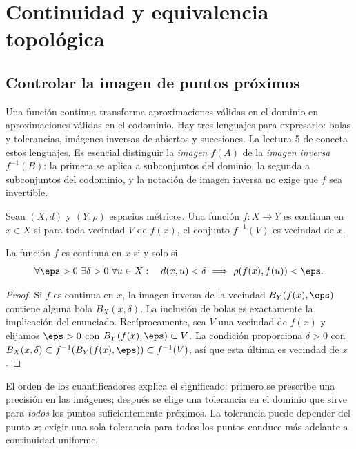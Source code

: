 \chapter{Continuidad y equivalencia topológica}\label{chap:05}
\section{Controlar la imagen de puntos próximos}
Una función continua transforma aproximaciones válidas en el dominio en aproximaciones válidas en el codominio. Hay tres lenguajes para expresarlo: bolas y tolerancias, imágenes inversas de abiertos y sucesiones. La lectura 5 de \cite{valencia} conecta estos lenguajes. Es esencial distinguir la \emph{imagen} $f(A)$ de la \emph{imagen inversa} $f^{-1}(B)$: la primera se aplica a subconjuntos del dominio, la segunda a subconjuntos del codominio, y la notación de imagen inversa no exige que $f$ sea invertible.

\begin{definicion}\label{ch05:continua}
Sean $(X,d)$ y $(Y,\rho)$ espacios métricos. Una función $f:X\to Y$ es continua en $x\in X$ si para toda vecindad $V$ de $f(x)$, el conjunto $f^{-1}(V)$ es vecindad de $x$.
\end{definicion}

\begin{teorema}\label{ch05:epsdelta}
La función $f$ es continua en $x$ si y solo si
\[
\forall\eps>0\ \exists\delta>0\ \forall u\in X:
\quad d(x,u)<\delta\ \Longrightarrow\ \rho(f(x),f(u))<\eps.
\]
\end{teorema}
\begin{proof}
Si $f$ es continua en $x$, la imagen inversa de la vecindad $B_Y(f(x),\eps)$ contiene alguna bola $B_X(x,\delta)$. La inclusión de bolas es exactamente la implicación del enunciado. Recíprocamente, sea $V$ una vecindad de $f(x)$ y elijamos $\eps>0$ con $B_Y(f(x),\eps)\subset V$. La condición proporciona $\delta>0$ con $B_X(x,\delta)\subset f^{-1}(B_Y(f(x),\eps))\subset f^{-1}(V)$, así que esta última es vecindad de $x$.
\end{proof}
El orden de los cuantificadores explica el significado: primero se prescribe una precisión en las imágenes; después se elige una tolerancia en el dominio que sirve para \emph{todos} los puntos suficientemente próximos. La tolerancia puede depender del punto $x$; exigir una sola tolerancia para todos los puntos conduce más adelante a continuidad uniforme.

